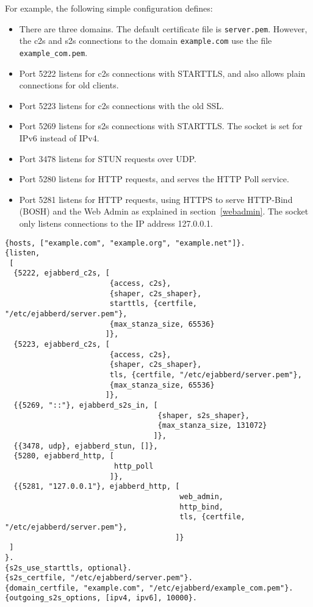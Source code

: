 \documentclass[a4paper,10pt]{book}
\newcommand{\term}[1]{\texttt{#1}}
\begin{document}
For example, the following simple configuration defines:
\begin{itemize}
\item There are three domains. The default certificate file is \term{server.pem}.
However, the c2s and s2s connections to the domain \term{example.com} use the file \term{example\_com.pem}.
\item Port 5222 listens for c2s connections with STARTTLS,
  and also allows plain connections for old clients.
\item Port 5223 listens for c2s connections with the old SSL.
\item Port 5269 listens for s2s connections with STARTTLS. The socket is set for IPv6 instead of IPv4.
\item Port 3478 listens for STUN requests over UDP.
\item Port 5280 listens for HTTP requests, and serves the HTTP Poll service.
\item Port 5281 listens for HTTP requests, using HTTPS to serve HTTP-Bind (BOSH) and the Web Admin as explained in
  section~\ref{webadmin}. The socket only listens connections to the IP address 127.0.0.1.
\end{itemize}
\begin{verbatim}
{hosts, ["example.com", "example.org", "example.net"]}.
{listen,
 [
  {5222, ejabberd_c2s, [
                        {access, c2s},
                        {shaper, c2s_shaper},
                        starttls, {certfile, "/etc/ejabberd/server.pem"},
                        {max_stanza_size, 65536}
                       ]},
  {5223, ejabberd_c2s, [
                        {access, c2s},
                        {shaper, c2s_shaper},
                        tls, {certfile, "/etc/ejabberd/server.pem"},
                        {max_stanza_size, 65536}
                       ]},
  {{5269, "::"}, ejabberd_s2s_in, [
                                   {shaper, s2s_shaper},
                                   {max_stanza_size, 131072}
                                  ]},
  {{3478, udp}, ejabberd_stun, []},
  {5280, ejabberd_http, [
                         http_poll
                        ]},
  {{5281, "127.0.0.1"}, ejabberd_http, [
                                        web_admin,
                                        http_bind,
                                        tls, {certfile, "/etc/ejabberd/server.pem"},
                                       ]}
 ]
}.
{s2s_use_starttls, optional}.
{s2s_certfile, "/etc/ejabberd/server.pem"}.
{domain_certfile, "example.com", "/etc/ejabberd/example_com.pem"}.
{outgoing_s2s_options, [ipv4, ipv6], 10000}.
\end{verbatim}
\end{document}
